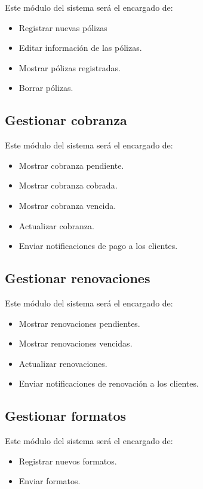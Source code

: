 Este m\'odulo del sistema ser\'a el encargado de:
\begin{itemize}
	\item Registrar nuevas pólizas
	\item Editar información de las pólizas.
	\item Mostrar pólizas registradas.
	\item Borrar pólizas.
\end{itemize}

\subsection*{Gestionar cobranza}

Este m\'odulo del sistema ser\'a el encargado de:
\begin{itemize}
	\item Mostrar cobranza pendiente.
	\item Mostrar cobranza cobrada.
	\item Mostrar cobranza vencida.
	\item Actualizar cobranza.
	\item Enviar notificaciones de pago a los clientes.
\end{itemize}

\subsection*{Gestionar renovaciones}

Este m\'odulo del sistema ser\'a el encargado de:
\begin{itemize}
	\item Mostrar renovaciones pendientes.
	\item Mostrar renovaciones vencidas.
	\item Actualizar renovaciones.
	\item Enviar notificaciones de renovación a los clientes.
\end{itemize}

\subsection*{Gestionar formatos}

Este m\'odulo del sistema ser\'a el encargado de:
\begin{itemize}
	\item Registrar nuevos formatos.
	\item Enviar formatos.
\end{itemize}

